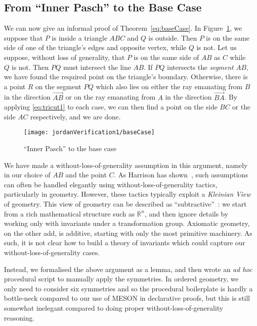 \subsection{From ``Inner Pasch'' to the Base Case}\label{sec:JordanBaseCase1}
We can now give an informal proof of Theorem~\ref{eq:baseCase}. In Figure~\ref{fig:BaseCasePasch}, we suppose that $P$ is inside a triangle $ABC$ and $Q$ is outside. Then $P$ is on the same side of one of the triangle's edges and opposite vertex, while $Q$ is not. Let us suppose, without loss of generality, that $P$ is on the same side of $AB$ as $C$ while $Q$ is not. Then $PQ$ must intersect the line $AB$. If $PQ$ intersects the \emph{segment} $AB$, we have found the required point on the triangle's boundary. Otherwise, there is a point $R$ on the segment $PQ$ which also lies on either the ray emanating from $B$ in the direction $\overrightarrow{AB}$ or on the ray emanating from $A$ in the direction $\overrightarrow{BA}$. By applying \eqref{eq:tricut1} to each case, we can then find a point on the side $BC$ or the side $AC$ respectively, and we are done.

\begin{figure}
\centering\texttt{[image: jordanVerification1/baseCase]}
\caption{``Inner Pasch'' to the base case}
\label{fig:BaseCasePasch}
\end{figure}

We have made a without-loss-of-generality assumption in this argument, namely in our choice of $AB$ and the point $C$. As Harrison has shown~\cite{HarrisonWLOG}, such assumptions can often be handled elegantly using without-loss-of-generality tactics, particularly in geometry. However, these tactics typically exploit a \emph{Kleinian View} of geometry. This view of geometry can be described as ``subtractive''~\cite{SubtractiveKlein}: we start from a rich mathematical structure such as $\mathbb{R}^n$, and then ignore details by working only with invariants under a transformation group. Axiomatic geometry, on the other add, is additive, starting with only the most primitive machinery. As such, it is not clear how to build a theory of invariants which could capture our without-loss-of-generality cases.

Instead, we formalised the above argument as a lemma, and then wrote an \emph{ad hoc} procedural script to manually apply the symmetries. In ordered geometry, we only need to consider six symmetries and so the procedural boilerplate is hardly a bottle-neck compared to our use of MESON in declarative proofs, but this is still somewhat inelegant compared to doing proper without-loss-of-generality reasoning.

